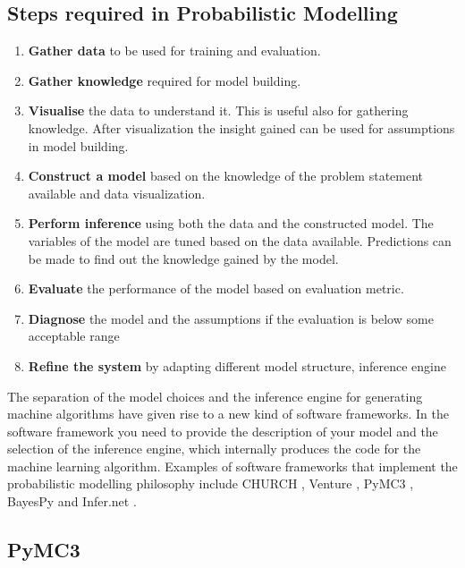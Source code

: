 \subsection*{Steps required in Probabilistic Modelling}
\label{sub:steps}
\begin{enumerate}
	\item \textbf{Gather data} to be used for training and evaluation.
    \item \textbf{Gather knowledge} required for model building.
    \item \textbf{Visualise} the data to understand it. This is useful also for gathering knowledge. After visualization the insight gained can be used for assumptions in model building.
    \item \textbf{Construct a model} based on the knowledge of the problem statement available and data visualization. 
    \item \textbf{Perform inference} using both the data and the constructed model. The variables of the model are tuned based on the data available. Predictions can be made to find out the knowledge gained by the model.
    \item \textbf{Evaluate} the performance of the model based on evaluation metric.
    \item \textbf{Diagnose} the model and the assumptions if the evaluation is below some acceptable range
    \item \textbf{Refine the system} by adapting different model structure, inference engine

\end{enumerate}


The separation of the model choices and the inference engine for generating machine algorithms have given rise to a new kind of software frameworks.
In the software framework you need to provide the description of your model and the selection of the inference engine, which internally produces the code for the machine learning algorithm.
Examples of software frameworks that implement the probabilistic modelling philosophy  include CHURCH \cite{goodman_church_2012}, Venture \cite{mansinghka_venture_2014}, PyMC3 \cite{salvatier_probabilistic_2015}, BayesPy \cite{luttinen_bayespy_2014} and Infer.net \cite{minka_2010}.

\subsection{PyMC3}

